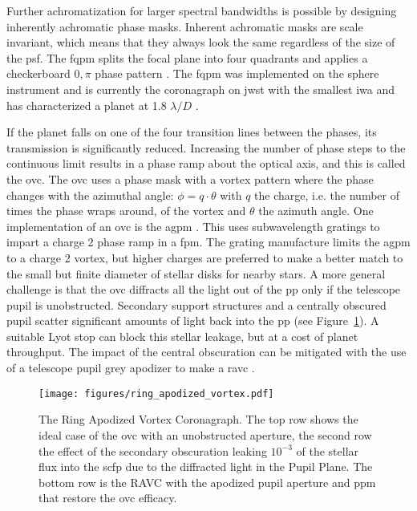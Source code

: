\documentclass[letterpaper]{ar-1col}
\newcommand{\ld}{$\lambda/D$}
\newcommand{\acc}[1]{\entry{\acs{#1}}{\acl{#1}}}
\begin{document}
\begin{armarginnote}[]
\acc{ovc}
\acc{fqpm}
\acc{agpm}
\end{armarginnote}

Further achromatization for larger spectral bandwidths is possible by designing inherently achromatic phase masks.
%
Inherent achromatic masks are scale invariant, which means that they always look the same regardless of the size of the \ac{psf}.
%
The \ac{fqpm} splits the focal plane into four quadrants and applies a checkerboard $0,\pi$ phase pattern \citep{Riaud00}.
%
The \ac{fqpm} was implemented on the \ac{sphere} instrument \citep{Boccaletti04} and is currently the coronagraph on \ac{jwst} with the smallest \ac{iwa} and has characterized a planet at 1.8 \ld{} \citep{franson2024jwst}. 

If the planet falls on one of the four transition lines between the phases, its transmission is significantly reduced.
%
Increasing the number of phase steps to the continuous limit results in a phase ramp about the optical axis, and this is called the \ac{ovc}.
%
The \ac{ovc} uses a phase mask with a vortex pattern where the phase changes with the azimuthal angle: $\phi=q \cdot \theta$ with $q$ the charge, i.e. the number of times the phase wraps around, of the vortex and $\theta$ the azimuth angle.
%
One implementation of an \ac{ovc} is the \acl{agpm} \citep[\acs{agpm}; ][]{Mawet05b}.
%
This uses subwavelength gratings to impart a charge 2 phase ramp in a \ac{fpm}.
%
The grating manufacture limits the \ac{agpm} to a charge 2 vortex, but higher charges are preferred to make a better match to the small but finite diameter of stellar disks for nearby stars.
%
A more general challenge is that the \ac{ovc} diffracts all the light out of the \ac{pp} only if the telescope pupil is unobstructed.
%
Secondary support structures and a centrally obscured pupil scatter significant amounts of light back into the \ac{pp} (see Figure~\ref{fig:ravc}).
%
A suitable Lyot stop can block this stellar leakage, but at a cost of planet throughput.
%
The impact of the central obscuration can be mitigated with the use of a telescope pupil grey apodizer to make a \acl{ravc} \citep[\acs{ravc}; ][]{Mawet13a}.
%



\begin{figure}[ht]
  \centering
  \texttt{[image: figures/ring\_apodized\_vortex.pdf]}
  \caption{The Ring Apodized Vortex Coronagraph.
  The top row shows the ideal case of the \ac{ovc} with an unobstructed aperture, the second row the effect of the secondary obscuration leaking $10^{-3}$ of the stellar flux into the \ac{scfp} due to the diffracted light in the Pupil Plane.
The bottom row is the RAVC with the apodized pupil aperture and \ac{ppm} that restore the \ac{ovc} efficacy.}
  \label{fig:ravc}
\end{figure}
\end{document}

